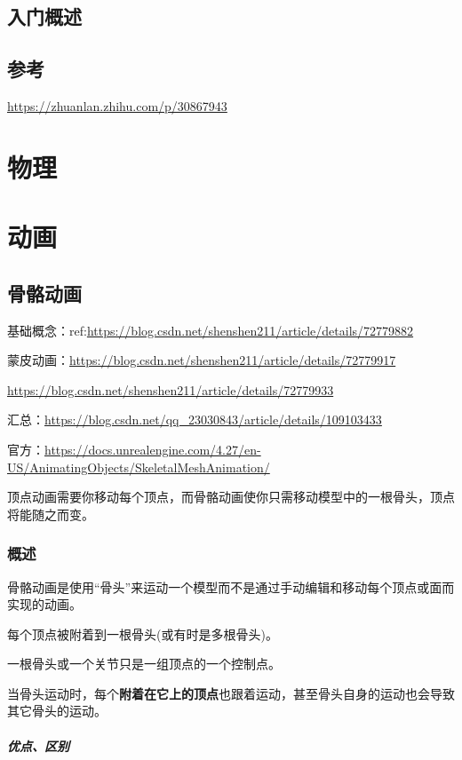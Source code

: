 \documentclass[UTF8,a4paper,12pt]{ctexbook}
\begin{document}
	\section{入门概述}
	
	
	\section{参考}
		\url{https://zhuanlan.zhihu.com/p/30867943}
	
	
		
\chapter{物理}
		
\chapter{动画}
	\section{骨骼动画}
	
		基础概念：ref:\url{https://blog.csdn.net/shenshen211/article/details/72779882}
		
		蒙皮动画：\url{https://blog.csdn.net/shenshen211/article/details/72779917}
		
		\url{https://blog.csdn.net/shenshen211/article/details/72779933}
		
		汇总：\url{https://blog.csdn.net/qq_23030843/article/details/109103433}
		
		官方：\url{https://docs.unrealengine.com/4.27/en-US/AnimatingObjects/SkeletalMeshAnimation/}
	
		顶点动画需要你移动每个顶点，而骨骼动画使你只需移动模型中的一根骨头，顶点将能随之而变。
		
		\subsection{概述}
			骨骼动画是使用“骨头”来运动一个模型而不是通过手动编辑和移动每个顶点或面而实现的动画。
			
			每个顶点被附着到一根骨头(或有时是多根骨头)。
			
			一根骨头或一个关节只是一组顶点的一个控制点。
			
			当骨头运动时，每个\textbf{附着在它上的顶点}也跟着运动，甚至骨头自身的运动也会导致其它骨头的运动。
			
			
			\paragraph{优点、区别}
			
\end{document}
